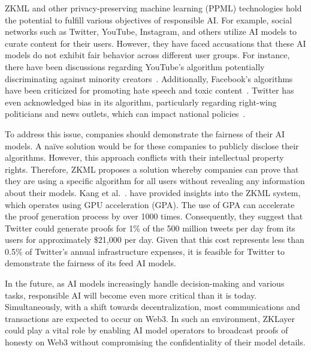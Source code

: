 \documentclass[conference]{IEEEtran}
\begin{document}
ZKML and other privacy-preserving machine learning (PPML) technologies hold the potential to fulfill various objectives of responsible AI. For example, social networks such as Twitter, YouTube, Instagram, and others utilize AI models to curate content for their users. However, they have faced accusations that these AI models do not exhibit fair behavior across different user groups. For instance, there have been discussions regarding YouTube's algorithm potentially discriminating against minority creators~\cite{YoutubeAlgorithmHackernoon}. Additionally, Facebook's algorithms have been criticized for promoting hate speech and toxic content~\cite{FacebookAlgorithmPeoplesDispatch}. Twitter has even acknowledged bias in its algorithm, particularly regarding right-wing politicians and news outlets, which can impact national policies~\cite{TwitterBiasTheGuardian}.



To address this issue, companies should demonstrate the fairness of their AI models. A naïve solution would be for these companies to publicly disclose their algorithms. However, this approach conflicts with their intellectual property rights. Therefore, ZKML proposes a solution whereby companies can prove that they are using a specific algorithm for all users without revealing any information about their models. Kang et al.~\cite{TensorPlonkMedium}. have provided insights into the ZKML system, which operates using GPU acceleration (GPA). The use of GPA can accelerate the proof generation process by over 1000 times. Consequently, they suggest that Twitter could generate proofs for 1\% of the 500 million tweets per day from its users for approximately \$21,000 per day. Given that this cost represents less than 0.5\% of Twitter's annual infrastructure expenses, it is feasible for Twitter to demonstrate the fairness of its feed AI models.

In the future, as AI models increasingly handle decision-making and various tasks, responsible AI will become even more critical than it is today. Simultaneously, with a shift towards decentralization, most communications and transactions are expected to occur on Web3. In such an environment, ZKLayer could play a vital role by enabling AI model operators to broadcast proofs of honesty on Web3 without compromising the confidentiality of their model details.
\end{document}
